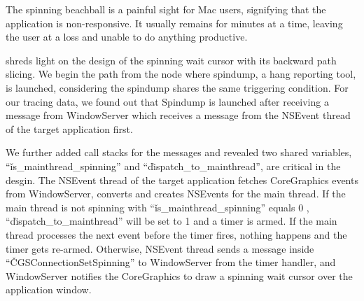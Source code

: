 The spinning beachball is a painful sight for Mac users, signifying that the
application is non-responsive. It usually remains for minutes at a time,
leaving the user at a loss and unable to do anything productive.

\xxx shreds light on the design of the spinning wait cursor with its backward
path slicing. We begin the path from the node where spindump, a hang reporting
tool, is launched, considering the spindump shares the same triggering
condition. For our tracing data, we found out that Spindump is launched after
receiving a message from WindowServer which receives a message from the NSEvent
thread of the target application first.

We further added call stacks for the messages and revealed two shared
variables, ``\v{is\_mainthread\_spinning}'' and
``\v{dispatch\_to\_mainthread}'', are critical in the desgin. The NSEvent
thread of the target application fetches CoreGraphics events from WindowServer,
converts and creates NSEvents for the main thread. If the main thread is not
spinning with ``\v{is\_mainthread\_spinning}'' equals 0 ,
``\v{dispatch\_to\_mainthread}'' will be set to 1 and a timer is armed. If the
main thread processes the next event before the timer fires, nothing happens
and the timer gets re-armed. Otherwise, NSEvent thread sends a message inside
``\v{CGSConnectionSetSpinning}'' to WindowServer from the timer handler, and
WindowServer notifies the CoreGraphics to draw a spinning wait cursor over the
application window.
